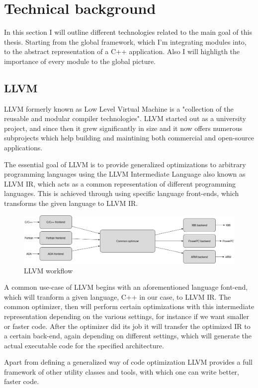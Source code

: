 \section{Technical background}
\par In this section I will outline different technologies related to the main goal of this thesis. Starting from the global framework, which I'm integrating modules into, to the abstract representation of a C++ application. Also I will highligth the importance of every module to the global picture.

\subsection{LLVM}
\par LLVM formerly known as Low Level Virtual Machine is a "collection of the reusable and modular compiler technologies"\cite{llvm_mainpage}. LLVM started out as a university project\cite{LLVM:CGO04}, and since then it grew significantly in size and it now offers numerous subprojects which help building and maintining both commercial and open-source applications. \medskip
\par The essential goal of LLVM is to provide generalized optimizations to arbitrary programming languages using the LLVM Intermediate Language also known as LLVM IR, which acts as a common representation of different programming languages. This is achieved through using specific language front-ends, which transforms the given language to LLVM IR. 
\begin{figure}[h]
	\caption{LLVM workflow}
	\includegraphics[scale=0.33]{images/llvm_flow}
\end{figure}
\par A common use-case of LLVM begins with an aforementioned language font-end, which will tranform a given language, C++ in our case, to LLVM IR. The common optimizer, then will perform certain optimizations with this intermediate representation depending on the various settings, for instance if we want smaller or faster code. After the optimizer did its job it will transfer the optimized IR to a certain back-end, again depending on different settings, which will generate the actual executable code for the specified architecture. \medskip
\par Apart from defining a generalized way of code optimization LLVM provides a full framework of other utility classes and tools, with which one can write better, faster code.

